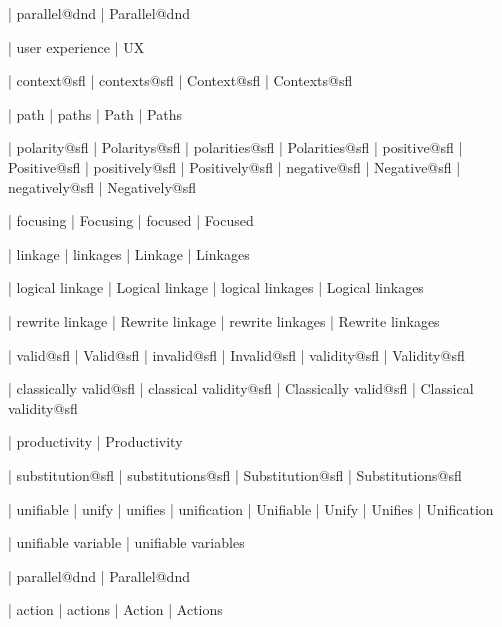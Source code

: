  | parallel@dnd
 | Parallel@dnd


 | user experience
 | UX
 
 | context@sfl
 | contexts@sfl
 | Context@sfl
 | Contexts@sfl

 | path
 | paths
 | Path
 | Paths

 | polarity@sfl
 | Polaritys@sfl
 | polarities@sfl
 | Polarities@sfl
 | positive@sfl
 | Positive@sfl
 | positively@sfl
 | Positively@sfl
 | negative@sfl
 | Negative@sfl
 | negatively@sfl
 | Negatively@sfl

 | focusing
 | Focusing
 | focused
 | Focused

 | linkage
 | linkages
 | Linkage
 | Linkages

 | logical linkage
 | Logical linkage
 | logical linkages
 | Logical linkages

 | rewrite linkage
 | Rewrite linkage
 | rewrite linkages
 | Rewrite linkages

 | valid@sfl
 | Valid@sfl
 | invalid@sfl
 | Invalid@sfl
 | validity@sfl
 | Validity@sfl

 | classically valid@sfl
 | classical validity@sfl
 | Classically valid@sfl
 | Classical validity@sfl

 | productivity
 | Productivity
 
 | substitution@sfl
 | substitutions@sfl
 | Substitution@sfl
 | Substitutions@sfl

 | unifiable
 | unify
 | unifies
 | unification
 | Unifiable
 | Unify
 | Unifies
 | Unification

 | unifiable variable
 | unifiable variables

 | parallel@dnd
 | Parallel@dnd


 | action
 | actions
 | Action
 | Actions



